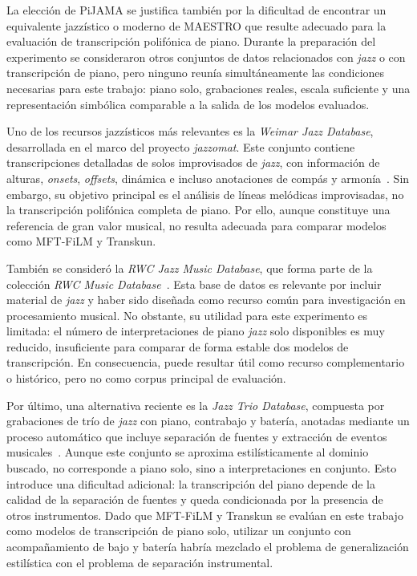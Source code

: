 \documentclass[11pt,spanish,listoffigures,listoftables]{tfgetsinf}
\begin{document}
La elección de PiJAMA se justifica también por la dificultad de encontrar un equivalente
jazzístico o moderno de MAESTRO que resulte adecuado para la evaluación de transcripción
polifónica de piano. Durante la preparación del experimento se consideraron otros
conjuntos de datos relacionados con \textit{jazz} o con transcripción de piano, pero ninguno
reunía simultáneamente las condiciones necesarias para este trabajo: piano solo,
grabaciones reales, escala suficiente y una representación simbólica comparable a la
salida de los modelos evaluados.

Uno de los recursos jazzísticos más relevantes es la \textit{Weimar Jazz Database}, desarrollada
en el marco del proyecto \textit{jazzomat}. Este conjunto contiene transcripciones detalladas
de solos improvisados de \textit{jazz}, con información de alturas, \textit{onsets}, \textit{offsets}, dinámica e
incluso anotaciones de compás y armonía~\cite{pfleiderer2017jazzomat}. Sin embargo,
su objetivo principal es el análisis de líneas melódicas improvisadas, no la transcripción
polifónica completa de piano. Por ello, aunque constituye una referencia de gran valor
musical, no resulta adecuada para comparar modelos como MFT-FiLM y Transkun.

También se consideró la \textit{RWC Jazz Music Database}, que forma parte de la colección
\textit{RWC Music Database}~\cite{goto2002rwc}. Esta base de datos es relevante por incluir
material de \textit{jazz} y haber sido diseñada como recurso común para investigación en
procesamiento musical. No obstante, su utilidad para este experimento es limitada:
el número de interpretaciones de piano \textit{jazz} solo disponibles es muy reducido, insuficiente para comparar de forma
estable dos modelos de transcripción. En consecuencia, puede resultar útil como recurso
complementario o histórico, pero no como corpus principal de evaluación.

Por último, una alternativa reciente es la \textit{Jazz Trio Database}, compuesta por grabaciones de trío
de \textit{jazz} con piano, contrabajo y batería, anotadas mediante un proceso automático que
incluye separación de fuentes y extracción de eventos musicales~\cite{cheston2024jtd}.
Aunque este conjunto se aproxima estilísticamente al dominio buscado, no
corresponde a piano solo, sino a interpretaciones en conjunto. Esto introduce una
dificultad adicional: la transcripción del piano depende de la calidad de la separación
de fuentes y queda condicionada por la presencia de otros instrumentos. Dado que
MFT-FiLM y Transkun se evalúan en este trabajo como modelos de transcripción de
piano solo, utilizar un conjunto con acompañamiento de bajo y batería habría mezclado
el problema de generalización estilística con el problema de separación instrumental.
\end{document}
